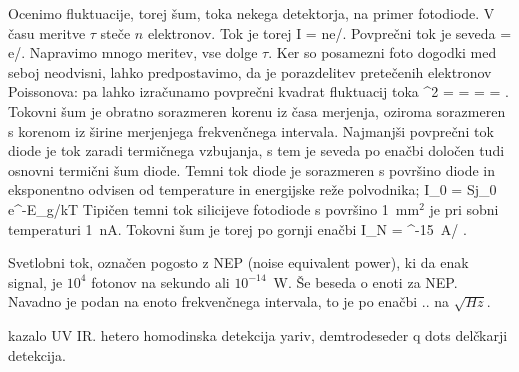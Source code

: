 Ocenimo fluktuacije, torej šum, toka nekega detektorja, na primer fotodiode. V času
meritve $\tau$ steče $n$ elektronov. Tok je torej
\beq
I = ne/\tau.
\eeq
Povprečni tok je seveda
\beq
{} = e/\tau.
\eeq
Napravimo mnogo meritev, vse dolge $\tau$. Ker so posamezni foto dogodki med seboj neodvisni, 
lahko predpostavimo, da je porazdelitev pretečenih elektronov Poissonova: pa lahko izračunamo
povprečni kvadrat fluktuacij toka
\beq
\sigma^2 =  =   = 
 = .
\eeq
Tokovni šum je obratno sorazmeren korenu iz časa merjenja, oziroma sorazmeren s korenom
iz širine merjenjega frekvenčnega intervala. Najmanjši povprečni tok diode je tok zaradi
termičnega vzbujanja, s tem je seveda po enačbi določen tudi osnovni termični šum diode.
Temni tok diode je sorazmeren s površino diode in eksponentno odvisen od temperature in 
energijske reže polvodnika;
\beq
I_0 = Sj_0 e^{-E_g/kT}
\eeq
Tipičen temni tok silicijeve fotodiode s površino 1~mm$^2$ je pri sobni temperaturi 1~nA. 
Tokovni šum je torej po gornji enačbi
\beq
I_N =  ^{-15}~A/ \sqrt{\Delta \nu}.
\eeq

Svetlobni tok, označen pogosto z NEP (noise equivalent power), ki da enak signal, je $10^4 $
fotonov na sekundo ali $10^{-14}$~W. Še beseda o enoti za NEP. Navadno je podan na enoto 
frekvenčnega intervala, to je po enačbi .. na $\sqrt{Hz}$. 



 kazalo UV IR.
 hetero homodinska detekcija
 yariv, demtrodeseder
 q dots
 delčkarji detekcija.
